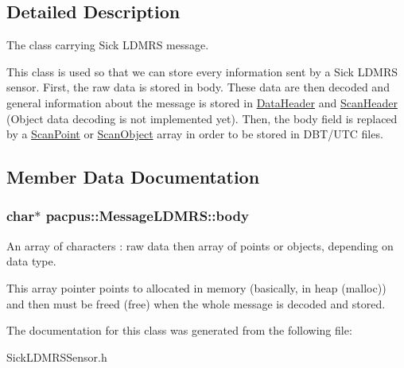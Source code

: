 \subsection{Detailed Description}
The class carrying Sick L\-D\-M\-R\-S message. 

This class is used so that we can store every information sent by a Sick L\-D\-M\-R\-S sensor. First, the raw data is stored in {\ttfamily body}. These data are then decoded and general information about the message is stored in \hyperlink{structpacpus_1_1DataHeader}{Data\-Header} and \hyperlink{structpacpus_1_1ScanHeader}{Scan\-Header} (Object data decoding is not implemented yet). Then, the body field is replaced by a \hyperlink{structpacpus_1_1ScanPoint}{Scan\-Point} or \hyperlink{structpacpus_1_1ScanObject}{Scan\-Object} array in order to be stored in D\-B\-T/\-U\-T\-C files. 

\subsection{Member Data Documentation}
\hypertarget{classpacpus_1_1MessageLDMRS_a33219ceede2224cd2cece39772d1012b}{
\subsubsection[{body}]{\setlength{\rightskip}{0pt plus 5cm}char$\ast$ pacpus\-::\-Message\-L\-D\-M\-R\-S\-::body}}\label{classpacpus_1_1MessageLDMRS_a33219ceede2224cd2cece39772d1012b}


An array of characters \-: raw data then array of points or objects, depending on data type. 

This array pointer points to allocated in memory (basically, in heap (malloc)) and then must be freed (free) when the whole message is decoded and stored. 

The documentation for this class was generated from the following file\-:\begin{DoxyCompactItemize}
\item 
Sick\-L\-D\-M\-R\-S\-Sensor.\-h\end{DoxyCompactItemize}
